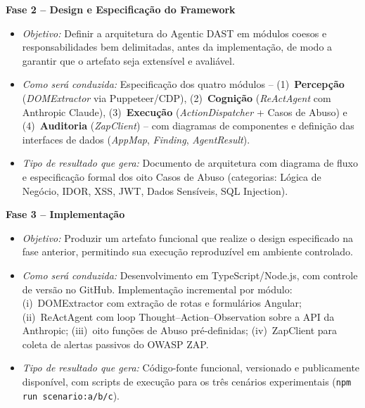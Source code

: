 \documentclass[12pt, a4paper]{article}
\begin{document}
\begin{itemize}
  \vspace{0.4em}
  \textbf{Fase 2 -- Design e Especificação do Framework}
  \begin{itemize}
    \item \textit{Objetivo:} Definir a arquitetura do Agentic DAST em módulos coesos e responsabilidades bem delimitadas, antes da implementação, de modo a garantir que o artefato seja extensível e avaliável.
    \item \textit{Como será conduzida:} Especificação dos quatro módulos -- (1)~\textbf{Percepção} (\textit{DOMExtractor} via Puppeteer/CDP), (2)~\textbf{Cognição} (\textit{ReActAgent} com Anthropic Claude), (3)~\textbf{Execução} (\textit{ActionDispatcher} + Casos de Abuso) e (4)~\textbf{Auditoria} (\textit{ZapClient}) -- com diagramas de componentes e definição das interfaces de dados (\textit{AppMap}, \textit{Finding}, \textit{AgentResult}).
    \item \textit{Tipo de resultado que gera:} Documento de arquitetura com diagrama de fluxo e especificação formal dos oito Casos de Abuso (categorias: Lógica de Negócio, IDOR, XSS, JWT, Dados Sensíveis, SQL Injection).
  \end{itemize}

  \vspace{0.4em}
  \textbf{Fase 3 -- Implementação}
  \begin{itemize}
    \item \textit{Objetivo:} Produzir um artefato funcional que realize o design especificado na fase anterior, permitindo sua execução reproduzível em ambiente controlado.
    \item \textit{Como será conduzida:} Desenvolvimento em TypeScript/Node.js, com controle de versão no GitHub. Implementação incremental por módulo: (i)~DOMExtractor com extração de rotas e formulários Angular; (ii)~ReActAgent com loop Thought--Action--Observation sobre a API da Anthropic; (iii)~oito funções de Abuso pré-definidas; (iv)~ZapClient para coleta de alertas passivos do OWASP ZAP.
    \item \textit{Tipo de resultado que gera:} Código-fonte funcional, versionado e publicamente disponível, com scripts de execução para os três cenários experimentais (\texttt{npm run scenario:a/b/c}).
  \end{itemize}


\end{itemize}
\end{document}
